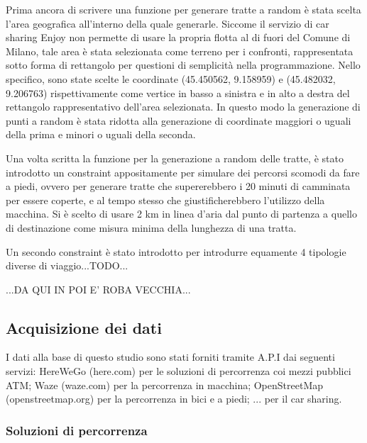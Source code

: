 Prima ancora di scrivere una funzione per generare tratte a random è stata scelta l'area geografica all'interno della quale generarle. Siccome il servizio di car sharing Enjoy non permette di usare la propria flotta al di fuori del Comune di Milano, tale area è stata selezionata come terreno per i confronti, rappresentata sotto forma di rettangolo per questioni di semplicità nella programmazione. Nello specifico, sono state scelte le coordinate (45.450562\textdegree, 9.158959\textdegree) e (45.482032\textdegree, 9.206763\textdegree) rispettivamente come vertice in basso a sinistra e in alto a destra del rettangolo rappresentativo dell'area selezionata. In questo modo la generazione di punti a random è stata ridotta alla generazione di coordinate maggiori o uguali della prima e minori o uguali della seconda.

Una volta scritta la funzione per la generazione a random delle tratte, è stato introdotto un constraint appositamente per simulare dei percorsi scomodi da fare a piedi, ovvero per generare tratte che supererebbero i 20 minuti di camminata per essere coperte, e al tempo stesso che giustificherebbero l'utilizzo della macchina. Si è scelto di usare 2 km in linea d'aria dal punto di partenza a quello di destinazione come misura minima della lunghezza di una tratta.

Un secondo constraint è stato introdotto per introdurre equamente 4 tipologie diverse di viaggio...TODO...

...DA QUI IN POI E' ROBA VECCHIA...

\subsection{Acquisizione dei dati}

I dati alla base di questo studio sono stati forniti tramite A.P.I dai seguenti servizi: HereWeGo (here.com) per le soluzioni di percorrenza coi mezzi pubblici ATM; Waze (waze.com) per la percorrenza in macchina; OpenStreetMap (openstreetmap.org) per la percorrenza in bici e a piedi; ... per il car sharing.

\subsubsection{Soluzioni di percorrenza}

